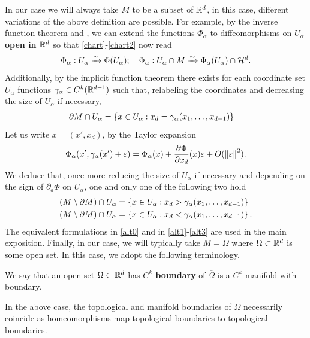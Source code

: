 \documentclass[
    a4paper,
    DIV=14,
    abstract=true,
    numbers=noenddot
]{scrartcl}
\begin{document}
In our case we will always take $M$ to be a subset of  $\mathbb{R}^d$, in this case, different variations of the above definition are possible. For example, by the inverse function theorem and , we can extend the functions $\Phi_\alpha$ to diffeomorphisms on $U_\alpha$ \textbf{open in $\mathbb{R}^d$} so that \eqref{chart}-\eqref{chart2} now read
\begin{align}\label{alt0}
	\Phi_\alpha : U_\alpha \xrightarrow{\sim}  \Phi(U_\alpha); \quad    \Phi_\alpha : U_\alpha \cap M \xrightarrow{\sim}  \Phi_\alpha(U_\alpha) \cap \mathcal{H}^d .
\end{align}
Additionally, by the implicit function theorem there exists for each coordinate set $U_\alpha$  functions $\gamma_\alpha \in C^k(\mathbb{R}^{d-1}) $ such that, relabeling the coordinates and decreasing the size of $U_\alpha$ if necessary,
\begin{align}\label{alt1}
	\partial M \cap U_\alpha & =\left\{x \in U_\alpha : x_d=\gamma_\alpha(x_1,\ldots,x_{d-1}) \right\}
\end{align}
Let us write $x=(x',x_d)$, by the Taylor expansion
\begin{align*}
	\Phi_\alpha(x',\gamma _\alpha(x')+\varepsilon)=\Phi_\alpha(x)+\frac{\partial \Phi}{\partial x_d}(x)\varepsilon +O(\left\lVert \varepsilon  \right\rVert^2)  .
\end{align*}
We deduce that,  once more reducing the size of $U_\alpha$ if necessary and depending on the sign of $\partial _d \Phi$ on $U_\alpha$, one and only one of the following two hold
\begin{align}\label{alt3}
	(M \setminus \partial M) \cap U_\alpha & =\left\{x \in U_\alpha : x_d>\gamma_\alpha(x_1,\ldots,x_{d-1}) \right\}        \\
	(M \setminus \partial M) \cap U_\alpha & =\left\{x \in U_\alpha : x_d<\gamma_\alpha(x_1,\ldots,x_{d-1}) \right\}\notag.
\end{align}
The equivalent formulations in \eqref{alt0} and in \eqref{alt1}-\eqref{alt3} are used in the main exposition. Finally, in our case, we will typically take $M =\overline{\Omega}$ where $\Omega \subset \mathbb{R}^d$ is some open set. In this case, we adopt the following terminology.
\begin{definition}
	We say that an open set $\Omega\subset \mathbb{R}^d$ has \textbf{$C^k$ boundary} of  $\overline{\Omega}$ is a $C^k$ manifold with boundary.
\end{definition}
In the above case, the topological and manifold boundaries of $\Omega$ necessarily coincide as homeomorphisms map topological boundaries to topological boundaries.











\end{document}
